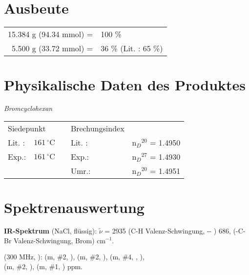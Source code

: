 \documentclass[12pt]{article}
\begin{document}
\begin{onehalfspace}
\section{Ausbeute} 
\begin{tabular}{ rl}
 15.384 g (94.34 mmol) =  & 100 \%   \\
  5.500  g (33.72 mmol) =  & 36 \% (Lit.\cite{organikum} : 65 \%)   \\
 \end{tabular}
\section{Physikalische Daten des Produktes} 
\textit{Bromcyclohexan} \\[0.2cm]
\begin{tabular}{ lrclc }
 \multicolumn{2}{l}{Siedepunkt} & & Brechungsindex  \\
   Lit. \cite{organikum} : & $ 161\,^{\circ}\mathrm{C} $ & &  Lit. \cite{organikum} : & n$_{D}$$^{20}$ = 1.4950 \\
   Exp.:  & $ 161\,^{\circ}\mathrm{C} $ & &  Exp.: & n$_{D}$$^{27}$ = 1.4930 \\
    &  &  & Umr.: & n$_{D}$$^{20}$ = 1.4951 \\
  \end{tabular}
\section{Spektrenauswertung} 
\textbf{IR-Spektrum } (NaCl, flüssig): $\tilde{\nu}$ = 2935 (C-H Valenz-Schwingung, -- )  686, (-C-Br Valenz-Schwingung, Brom) cm$^{-1}$.\\
\begin{experimental}[format=\bfseries,delta=(ppm),list=true,use-equal,pos-number = side]
\begin{minipage}[b]{0.85\textwidth} 

\NMR* (300 \si{\MHz}, ):  (m, \#{2}, ), 
                   (m, \#{2}, ),
                   (m, \#{4}, , ), \\
                   (m, \#{2}, ), 
                   (m, \#{1}, ) ppm.
  \end{minipage}
  \hfill
\begin{minipage}[t][][b]{0.15\textwidth} 
  \end{minipage}
\end{experimental} 


\end{onehalfspace}
\end{document}

